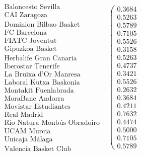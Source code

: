 	\[
	\begin{array}{ccc}
	\begin{array}{c}
	\text{Baloncesto Sevilla}\\
	\text{CAI Zaragoza} \\
	\text{Dominion Bilbao Basket} \\
	\text{FC Barcelona} \\
	\text{FIATC Joventut} \\
	\text{Gipuzkoa Basket} \\
	\text{Herbalife Gran Canaria} \\
	\text{Iberostar Tenerife} \\
	\text{La Bruixa d'Or Manresa} \\
	\text{Laboral Kutxa Baskonia} \\
	\text{Montakit Fuenlabrada} \\
	\text{MoraBanc Andorra} \\
	\text{Movistar Estudiantes} \\
	\text{Real Madrid} \\
	\text{Río Natura Monbús Obradoiro} \\
	\text{UCAM Murcia} \\
	\text{Unicaja Málaga} \\
	\text{Valencia Basket Club}
	\end{array} & \left(\begin{array}{c}
    0.3684\\
    0.5263\\
    0.5789\\
    0.7105\\
    0.5526\\
    0.3158\\
    0.5263\\
    0.4737\\
    0.3421\\
    0.5526\\
    0.2632\\
    0.3684\\
    0.4211\\
    0.7632\\
    0.4474\\
    0.5000\\
    0.7105\\
    0.5789


\end{array}
\end{array}\]
